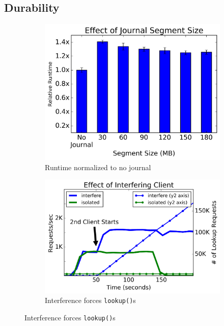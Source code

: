 \subsection{Durability}
\label{sec:durability}

\begin{figure}[t]
  \centering
  \begin{subfigure}[b]{.3\linewidth}
      \centering
      \includegraphics[width=1.0\linewidth]{./chapters/cudele/figures/slowdown-journal.png}
      \caption{Runtime normalized to no journal} \label{fig:overhead-a}
  \end{subfigure}
  \begin{subfigure}[b]{.3\linewidth}
      \centering
      \includegraphics[width=1.2\linewidth]{./chapters/cudele/figures/behavior-interfere.png}
      \caption{Interference forces \texttt{lookup()}s}

\end{subfigure}
\end{figure}
